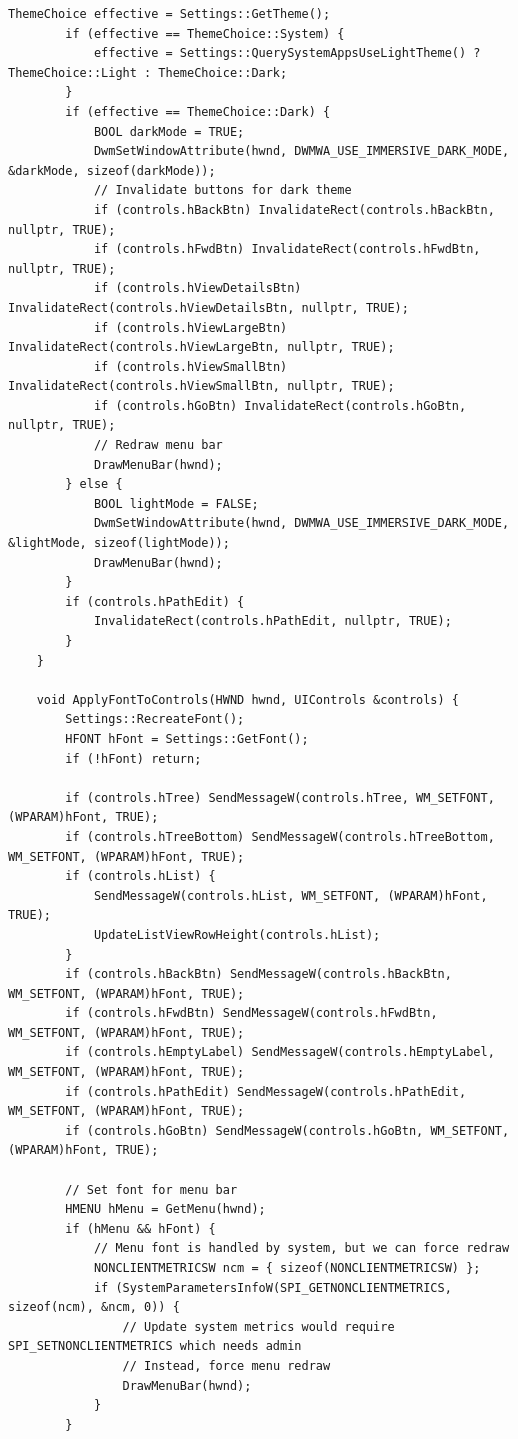 \begin{lstlisting}[style=CodeListing]
        ThemeChoice effective = Settings::GetTheme();
        if (effective == ThemeChoice::System) {
            effective = Settings::QuerySystemAppsUseLightTheme() ? ThemeChoice::Light : ThemeChoice::Dark;
        }
        if (effective == ThemeChoice::Dark) {
            BOOL darkMode = TRUE;
            DwmSetWindowAttribute(hwnd, DWMWA_USE_IMMERSIVE_DARK_MODE, &darkMode, sizeof(darkMode));
            // Invalidate buttons for dark theme
            if (controls.hBackBtn) InvalidateRect(controls.hBackBtn, nullptr, TRUE);
            if (controls.hFwdBtn) InvalidateRect(controls.hFwdBtn, nullptr, TRUE);
            if (controls.hViewDetailsBtn) InvalidateRect(controls.hViewDetailsBtn, nullptr, TRUE);
            if (controls.hViewLargeBtn) InvalidateRect(controls.hViewLargeBtn, nullptr, TRUE);
            if (controls.hViewSmallBtn) InvalidateRect(controls.hViewSmallBtn, nullptr, TRUE);
            if (controls.hGoBtn) InvalidateRect(controls.hGoBtn, nullptr, TRUE);
            // Redraw menu bar
            DrawMenuBar(hwnd);
        } else {
            BOOL lightMode = FALSE;
            DwmSetWindowAttribute(hwnd, DWMWA_USE_IMMERSIVE_DARK_MODE, &lightMode, sizeof(lightMode));
            DrawMenuBar(hwnd);
        }
        if (controls.hPathEdit) {
            InvalidateRect(controls.hPathEdit, nullptr, TRUE);
        }
    }
    
    void ApplyFontToControls(HWND hwnd, UIControls &controls) {
        Settings::RecreateFont();
        HFONT hFont = Settings::GetFont();
        if (!hFont) return;
        
        if (controls.hTree) SendMessageW(controls.hTree, WM_SETFONT, (WPARAM)hFont, TRUE);
        if (controls.hTreeBottom) SendMessageW(controls.hTreeBottom, WM_SETFONT, (WPARAM)hFont, TRUE);
        if (controls.hList) {
            SendMessageW(controls.hList, WM_SETFONT, (WPARAM)hFont, TRUE);
            UpdateListViewRowHeight(controls.hList);
        }
        if (controls.hBackBtn) SendMessageW(controls.hBackBtn, WM_SETFONT, (WPARAM)hFont, TRUE);
        if (controls.hFwdBtn) SendMessageW(controls.hFwdBtn, WM_SETFONT, (WPARAM)hFont, TRUE);
        if (controls.hEmptyLabel) SendMessageW(controls.hEmptyLabel, WM_SETFONT, (WPARAM)hFont, TRUE);
        if (controls.hPathEdit) SendMessageW(controls.hPathEdit, WM_SETFONT, (WPARAM)hFont, TRUE);
        if (controls.hGoBtn) SendMessageW(controls.hGoBtn, WM_SETFONT, (WPARAM)hFont, TRUE);
        
        // Set font for menu bar
        HMENU hMenu = GetMenu(hwnd);
        if (hMenu && hFont) {
            // Menu font is handled by system, but we can force redraw
            NONCLIENTMETRICSW ncm = { sizeof(NONCLIENTMETRICSW) };
            if (SystemParametersInfoW(SPI_GETNONCLIENTMETRICS, sizeof(ncm), &ncm, 0)) {
                // Update system metrics would require SPI_SETNONCLIENTMETRICS which needs admin
                // Instead, force menu redraw
                DrawMenuBar(hwnd);
            }
        }
        

\end{lstlisting}
